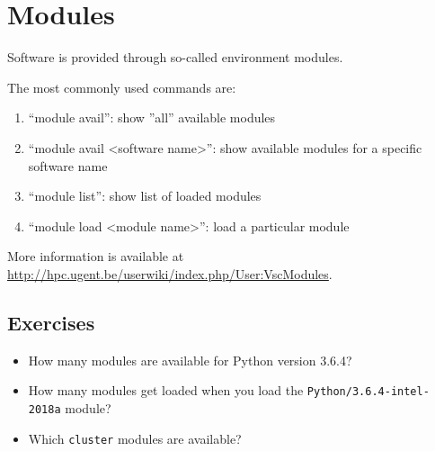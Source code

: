 \chapter{Modules}

Software is provided through so-called environment modules.

The most commonly used commands are:

\begin{enumerate}
 \item ``module avail'': show ''all'' available modules
 \item ``module avail <software name>'': show available modules for a specific software name
 \item ``module list'': show list of loaded modules
 \item ``module load <module name>'': load a particular module
\end{enumerate}

More information is available at
\url{http://hpc.ugent.be/userwiki/index.php/User:VscModules}.

\section{Exercises}

\begin{itemize}
    \item How many modules are available for Python version 3.6.4?
    \item How many modules get loaded when you load the \verb|Python/3.6.4-intel-2018a|
        module?
    \item Which \verb|cluster| modules are available?
\end{itemize}
